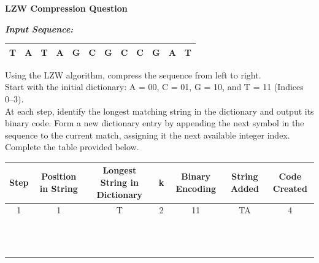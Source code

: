 \documentclass[11pt]{article}
\begin{document}
\begin{center}
{\Large \textbf{LZW Compression Question}}
\end{center}
\vspace{1em}
\noindent \textit{\textbf{Input Sequence:}}
\begin{center}
\renewcommand{\arraystretch}{1.5}
\begin{tabular}{|c|c|c|c|c|c|c|c|c|c|c|c|}
\hline
\rowcolor{white!95!black} T & A & T & A & G & C & G & C & C & G & A & T \\
\hline
\end{tabular}
\end{center}
\vspace{1em}
\noindent Using the LZW algorithm, compress the sequence from left to right. \\[1.5em]
Start with the initial dictionary: A = 00, C = 01, G = 10, and T = 11 (Indices 0--3). \\[1.5em]
At each step, identify the longest matching string in the dictionary and output its binary code. Form a new dictionary entry by appending the next symbol in the sequence to the current match, assigning it the next available integer index. Complete the table provided below.
\vspace{3em}
\par
\begin{center}
\small
\renewcommand{\arraystretch}{1.4}
\begin{tabular}{|c|c|c|c|c|c|c|}
\hline
\rowcolor{lightgray} Step & Position in String & Longest String in Dictionary & k & Binary Encoding & String Added & Code Created \\
\hline
\rowcolor{white!92!black} 1 & 1 & T & 2 & 11 & TA & 4 \\ \hline
 & & & & & & \\ \hline
 & & & & & & \\ \hline
 & & & & & & \\ \hline
 & & & & & & \\ \hline
 & & & & & & \\ \hline
 & & & & & & \\ \hline
 & & & & & & \\ \hline
 & & & & & & \\ \hline
 & & & & & & \\ \hline
 & & & & & & \\ \hline
 & & & & & & \\ \hline
 & & & & & & \\ \hline
\end{tabular}
\end{center}
\vspace{1em}
\end{document}
